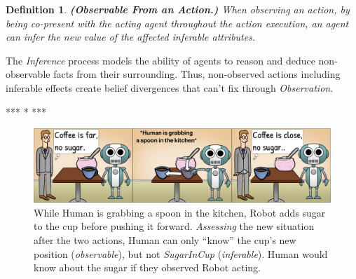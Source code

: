 \documentclass[letterpaper]{article} %
\newtheorem{definition}{Definition}
\begin{document}
\begin{definition} \label{def:inf}
    \textbf{(Observable From an Action.)} When observing an action, by being co-present with the acting agent throughout the action execution, an agent can infer the new value of the affected inferable attributes.  
\end{definition}


The \textit{Inference} process models the ability of agents to reason and deduce non-observable facts from their surrounding. Thus, non-observed actions including inferable effects create belief divergences that can't fix through \textit{Observation}. 

*** * *** %

\begin{figure}[t!]
    \centering
    \includegraphics[width=1.0\linewidth]{figures/cartoon_obs(2).png}
    \caption{
    While Human is grabbing a spoon in the kitchen, Robot adds sugar to the cup before pushing it forward. \textit{Assessing} the new situation after the two actions, Human can only ``know'' the cup's new position (\textit{observable}), but not \textit{SugarInCup} (\textit{inferable}). Human would know about the sugar if they observed Robot acting.
    }
    \label{fig:cartoon}
\end{figure}

\end{document}
